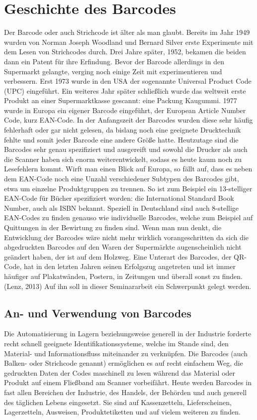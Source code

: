 \section{Geschichte des Barcodes}
Der Barcode oder auch Strichcode ist älter als man glaubt. Bereits im Jahr 1949 wurden von Norman Joseph Woodland und Bernard Silver erste Experimente mit dem Lesen von Strichcodes durch. Drei Jahre später, 1952, bekamen die beiden dann ein Patent für ihre Erfindung. 
Bevor der Barcode allerdings in den Supermarkt gelangte, verging noch einige Zeit mit experimentieren und verbessern. Erst 1973 wurde in den USA der sogenannte Universal Product Code (UPC) eingeführt. Ein weiteres Jahr später schließlich wurde das weltweit erste Produkt an einer Supermarktkasse gescannt: eine Packung Kaugummi.
1977 wurde in Europa ein eigener Barcode eingeführt, der European Article Number Code, kurz EAN-Code. 
In der Anfangszeit der Barcodes wurden diese sehr häufig fehlerhaft oder gar nicht gelesen, da bislang noch eine geeignete Drucktechnik fehlte und somit jeder Barcode eine andere Größe hatte. Heutzutage sind die Barcodes sehr genau spezifiziert und ausgereift und sowohl die Drucker als auch die Scanner haben sich enorm weiterentwickelt, sodass es heute kaum noch zu Lesefehlern kommt.
Wirft man einen Blick auf Europa, so fällt auf, dass es neben dem EAN-Code noch eine Unzahl verschiedener Subtypen des Barcodes gibt, etwa um einzelne Produktgruppen zu trennen. So ist zum Beispiel ein 13-stelliger EAN-Code für Bücher spezifiziert worden: die International Standard Book Number, auch als ISBN bekannt. Speziell in Deutschland sind auch 8-stellige EAN-Codes zu finden genauso wie individuelle Barcodes, welche zum Beispiel auf Quittungen in der Bewirtung zu finden sind.
Wenn man nun denkt, die Entwicklung der Barcodes wäre nicht mehr wirklich vorangeschritten da sich die abgedruckten Barcodes auf den Waren der Supermärkte augenscheinlich nicht geändert haben, der ist auf dem Holzweg. Eine Unterart des Barcodes, der QR-Code, hat in den letzten Jahren seinen Erfolgszug angetreten und ist immer häufiger auf Plakatwänden, Postern, in Zeitungen und überall sonst zu finden. (Lenz, 2013) Auf ihn soll in dieser Seminararbeit ein Schwerpunkt gelegt werden.

\subsection{An- und Verwendung von Barcodes}
Die Automatisierung in Lagern beziehungsweise generell in der Industrie forderte recht schnell geeignete Identifikationssysteme, welche im Stande sind, den Material- und Informationsfluss miteinander zu verknüpfen. Die Barcodes (auch Balken- oder Strichcode genannt) ermöglichen es auf recht einfachem Weg, die gedruckten Daten der Codes maschinell zu lesen während das Material oder Produkt auf einem Fließband am Scanner vorbeifährt. Heute werden Barcodes in fast allen Bereichen der Industrie, des Handels, der Behörden und auch generell des täglichen Lebens eingesetzt. Sie sind auf Kassenzetteln, Lieferscheinen, Lagerzetteln, Ausweisen, Produktetiketten und auf vielem weiteren zu finden.
\pagebreak

